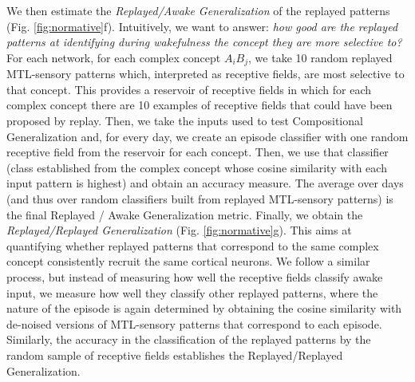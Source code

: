 \documentclass{article}
\begin{document}
We then estimate the \textit{Replayed/Awake Generalization} of the replayed patterns (Fig. \ref{fig:normative}f). Intuitively, we want to answer: \textit{how good are the replayed patterns at identifying during wakefulness the concept they are more selective to?} For each network, for each complex concept $A_iB_j$, we take 10 random replayed MTL-sensory patterns which, interpreted as receptive fields, are most selective to that concept. This provides a reservoir of receptive fields in which for each complex concept there are 10 examples of receptive fields that could have been proposed by replay. Then, we take the inputs used to test Compositional Generalization and, for every day, we create an episode classifier with one random receptive field from the reservoir for each concept. Then, we use that classifier (class established from the complex concept whose cosine similarity with each input pattern is highest) and obtain an accuracy measure. The average over days (and thus over random classifiers built from replayed MTL-sensory patterns) is the final Replayed / Awake Generalization metric.
\newline\newline
Finally, we obtain the \textit{Replayed/Replayed Generalization} (Fig. \ref{fig:normative}g). This aims at quantifying whether replayed patterns that correspond to the same complex concept consistently recruit the same cortical neurons. We follow a similar process, but instead of measuring how well the receptive fields classify awake input, we measure how well they classify other replayed patterns, where the nature of the episode is again determined by obtaining the cosine similarity with de-noised versions of MTL-sensory patterns that correspond to each episode. Similarly, the accuracy in the classification of the replayed patterns by the random sample of receptive fields establishes the Replayed/Replayed Generalization.
\end{document}
